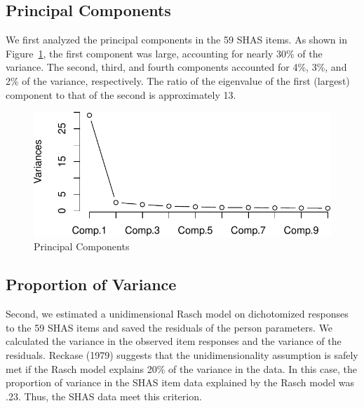 \documentclass[
  letterpaper,
  DIV=11,
  numbers=noendperiod]{scrreport}
\begin{document}
\hypertarget{principal-components}{%
\subsection*{Principal Components}\label{principal-components}}

We first analyzed the principal components in the 59 SHAS items. As
shown in Figure~\ref{fig-pca}, the first component was large, accounting
for nearly 30\% of the variance. The second, third, and fourth
components accounted for 4\%, 3\%, and 2\% of the variance,
respectively. The ratio of the eigenvalue of the first (largest)
component to that of the second is approximately 13.

\begin{figure}

{\centering \includegraphics{./results_files/figure-pdf/fig-pca-1.pdf}

}

\caption{\label{fig-pca}Principal Components}

\end{figure}

\hypertarget{proportion-of-variance}{%
\subsection*{Proportion of Variance}\label{proportion-of-variance}}

Second, we estimated a unidimensional Rasch model on dichotomized
responses to the 59 SHAS items and saved the residuals of the person
parameters. We calculated the variance in the observed item responses
and the variance of the residuals. Reckase (1979) suggests that the
unidimensionality assumption is safely met if the Rasch model explains
20\% of the variance in the data. In this case, the proportion of
variance in the SHAS item data explained by the Rasch model was .23.
Thus, the SHAS data meet this criterion.
\end{document}
